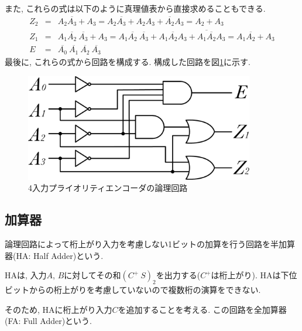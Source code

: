 \documentclass[titlepage]{jsarticle}
\begin{document}
    また, これらの式は以下のように真理値表から直接求めることもできる.
    \begin{eqnarray*}
      Z_2 &=& A_2 \overline{A_3} + A_3 =
        A_2 \overline{A_3} + A_2A_3 + \overline{A_2}A_3 =
        A_2 + A_3 \\
      Z_1 &=& A_1 \overline{A_2} \ \overline{A_3} + A_3 =
        A_1 \overline{A_2} \ \overline{A_3} + A_1 \overline{A_2}A_3 +
          \overline{A_1 \overline{A_2}} A_3 =
        A_1 \overline{A_2} + A_3 \\
      E &=& \overline{A_0} \ \overline{A_1} \ \overline{A_2} \ \overline{A_3}
    \end{eqnarray*}
    最後に, これらの式から回路を構成する.
    構成した回路を図\ref{fig:priority_encoder}に示す.
    \begin{figure}[h]
      \centering
      \includegraphics[width=10cm]{images/priority.pdf}
      \caption{4入力プライオリティエンコーダの論理回路}
      \label{fig:priority_encoder}
    \end{figure}
  \subsection{加算器} \label{subsec:FA}
    論理回路によって桁上がり入力を考慮しない1ビットの加算を行う回路を半加算器(HA: Half Adder)という.

    HAは, 入力$A$, $B$に対してその和$(C^+ \ S)_2$を出力する($C^+$は桁上がり).
    HAは下位ビットからの桁上がりを考慮していないので複数桁の演算をできない.

    そのため, HAに桁上がり入力$C$を追加することを考える.
    この回路を全加算器(FA: Full Adder)という.
\end{document}
